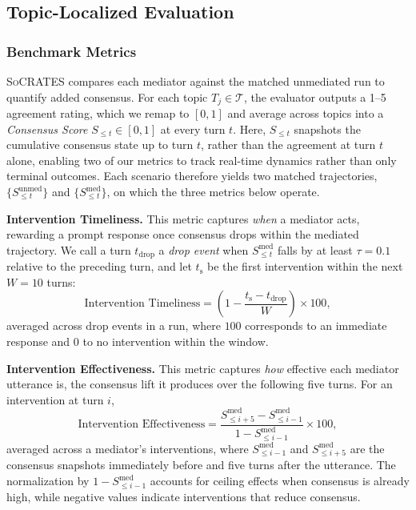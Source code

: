 \documentclass{llmxive}
\providecommand{\algname}{\textsc{SoCRATES}}
\begin{document}
\subsection{Topic-Localized Evaluation}
\label{sec:method:evaluation}

\subsubsection{Benchmark Metrics}
\label{sec:method:evaluation:metrics}

\algname{} compares each mediator against the matched unmediated run to quantify added consensus. For each topic $T_j \in \mathcal{T}$, the evaluator outputs a 1--5 agreement rating, which we remap to $[0,1]$ and average across topics into a \emph{Consensus Score} $S_{\leq t} \in [0,1]$ at every turn $t$. Here, $S_{\leq t}$ snapshots the cumulative consensus state up to turn $t$, rather than the agreement at turn $t$ alone, enabling two of our metrics to track real-time dynamics rather than only terminal outcomes. Each scenario therefore yields two matched trajectories, $\{S^\mathrm{unmed}_{\leq t}\}$ and $\{S^\mathrm{med}_{\leq t}\}$, on which the three metrics below operate.

\smallskip\smallskip\noindent\textbf{{Intervention Timeliness.}}
This metric captures \emph{when} a mediator acts, rewarding a prompt response once consensus drops within the mediated trajectory. We call a turn $t_\mathrm{drop}$ a \emph{drop event} when $S^\mathrm{med}_{\leq t}$ falls by at least $\tau = 0.1$ relative to the preceding turn, and let $t_\mathrm{s}$ be the first intervention within the next $W = 10$ turns:
\[
\text{Intervention Timeliness} =
\left(1 - \frac{t_\mathrm{s} - t_\mathrm{drop}}{W}\right) \times 100,
\]
averaged across drop events in a run, where $100$ corresponds to an immediate response and $0$ to no intervention within the window.

\smallskip\smallskip\noindent\textbf{{Intervention Effectiveness.}}
This metric captures \emph{how} effective each mediator utterance is, the consensus lift it produces over the following five turns. For an intervention at turn $i$,
\[\text{Intervention Effectiveness} = \frac{S^\mathrm{med}_{\leq i+5} - S^\mathrm{med}_{\leq i-1}}{1 - S^\mathrm{med}_{\leq i-1}} \times 100,\]
averaged across a mediator's interventions, where $S^\mathrm{med}_{\leq i-1}$ and $S^\mathrm{med}_{\leq i+5}$ are the consensus snapshots immediately before and five turns after the utterance. The normalization by $1 - S^\mathrm{med}_{\leq i-1}$ accounts for ceiling effects when consensus is already high, while negative values indicate interventions that reduce consensus.
\end{document}
